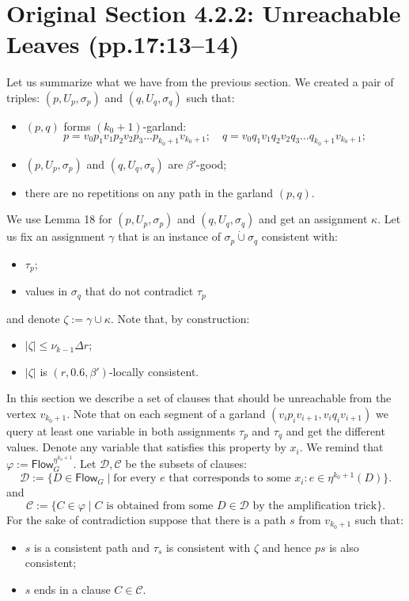 \documentclass[10pt,a4paper]{article}
\newcommand{\Flow}{\mathsf{Flow}}
\newcommand{\joint}{\mathbin{\dot\cup}}
\begin{document}
\section*{Original Section 4.2.2: Unreachable Leaves (pp.17:13--14)}
Let us summarize what we have from the previous section. We created a pair of triples: $(p,U_p,\sigma_p)$ and $(q,U_q,\sigma_q)$ such that:
\begin{itemize}\item $(p,q)$ forms $(k_0+1)$-garland:
\[p=v_0p_1v_1p_2v_2p_3\ldots p_{k_0+1}v_{k_0+1};\quad q=v_0q_1v_1q_2v_2q_3\ldots q_{k_0+1}v_{k_0+1};\]
\item $(p,U_p,\sigma_p)$ and $(q,U_q,\sigma_q)$ are $\beta'$-good;
\item there are no repetitions on any path in the garland $(p,q)$.\end{itemize}
We use Lemma 18 for $(p,U_p,\sigma_p)$ and $(q,U_q,\sigma_q)$ and get an assignment $\kappa$. Let us fix an assignment $\gamma$ that is an instance of $\sigma_p\joint\sigma_q$ consistent with:
\begin{itemize}\item $\tau_p$;
\item values in $\sigma_q$ that do not contradict $\tau_p$\end{itemize}
and denote $\zeta:=\gamma\cup\kappa$. Note that, by construction:
\begin{itemize}\item $|\zeta|\le\nu_{k-1}\Delta r$;
\item $|\zeta|$ is $(r,0.6,\beta')$-locally consistent.\end{itemize}
In this section we describe a set of clauses that should be unreachable from the vertex $v_{k_0+1}$. Note that on each segment of a garland $(v_ip_iv_{i+1},v_iq_iv_{i+1})$ we query at least one variable in both assignments $\tau_p$ and $\tau_q$ and get the different values. Denote any variable that satisfies this property by $x_i$.
We remind that $\varphi:=\Flow_G^{\eta^{k_0+1}}$. Let $\mathcal D,\mathcal C$ be the subsets of clauses:
\[\mathcal D:=\{D\in\Flow_G\mid\text{for every }e\text{ that corresponds to some }x_i:e\in\eta^{k_0+1}(D)\}.\]
and
\[\mathcal C:=\{C\in\varphi\mid C\text{ is obtained from some }D\in\mathcal D\text{ by the amplification trick}\}.\]
For the sake of contradiction suppose that there is a path $s$ from $v_{k_0+1}$ such that:
\begin{itemize}\item $s$ is a consistent path and $\tau_s$ is consistent with $\zeta$ and hence $ps$ is also consistent;
\item $s$ ends in a clause $C\in\mathcal C$.\end{itemize}
\end{document}

